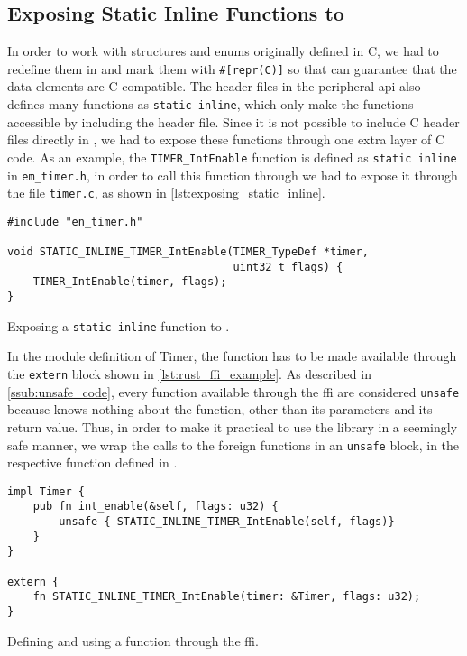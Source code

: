 \subsection{Exposing Static Inline Functions to \rust}

In order to work with structures and enums originally defined in C, we had to redefine them in \rust and mark them with \texttt{\#[repr(C)]} so that \rust can guarantee that the data-elements are C compatible.
The header files in the peripheral \gls{api} also defines many functions as \texttt{static inline}, which only make the functions accessible by including the header file.
Since it is not possible to include C header files directly in \rust, we had to expose these functions through one extra layer of C code.
As an example, the \texttt{TIMER\_IntEnable} function is defined as \texttt{static inline} in \texttt{em\_timer.h}, in order to call this function through \rust we had to expose it through the file \texttt{timer.c}, as shown in \autoref{lst:exposing_static_inline}.

\begin{listing}[h]
\begin{verbatim}
#include "en_timer.h"

void STATIC_INLINE_TIMER_IntEnable(TIMER_TypeDef *timer,
                                   uint32_t flags) {
    TIMER_IntEnable(timer, flags);
}
\end{verbatim}
\caption{Exposing a \texttt{static inline} function to \rust.}
\label{lst:exposing_static_inline}
\end{listing}

In the \rust module definition of Timer, the function has to be made available through the \texttt{extern} block shown in \autoref{lst:rust_ffi_example}.
As described in \autoref{ssub:unsafe_code}, every function available through the \gls{ffi} are considered \texttt{unsafe} because \rust knows nothing about the function, other than its parameters and its return value.
Thus, in order to make it practical to use the library in a seemingly safe manner, we wrap the calls to the foreign functions in an \texttt{unsafe} block, in the respective function defined in \rust.

\begin{listing}[h]
\begin{verbatim}
impl Timer {
    pub fn int_enable(&self, flags: u32) {
        unsafe { STATIC_INLINE_TIMER_IntEnable(self, flags)}
    }
}

extern {
    fn STATIC_INLINE_TIMER_IntEnable(timer: &Timer, flags: u32);
}
\end{verbatim}
\caption{Defining and using a function through the \rust \gls{ffi}.}
\label{lst:rust_ffi_example}
\end{listing}

